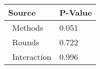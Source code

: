 
\centering
\begin{tabular}{ll}
\toprule
          Source & P-Value \\
\midrule
    \    Methods &   0.051 \\
     \    Rounds &   0.722 \\
\    Interaction &   0.996 \\
\bottomrule
\end{tabular}
